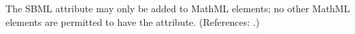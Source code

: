 The SBML attribute  may only be added to MathML 
elements; no other MathML elements are permitted to have the 
attribute.  (References: .)
